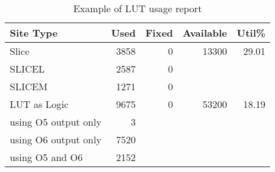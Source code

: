 \begin{table}[tbp]
  \centering
  \caption{Example of LUT usage report}
  \label{tab:eg_lut}
  \begin{tabular}{|l|r|r|r|r|}
    \hline
                 Site Type                 &  Used & Fixed & Available & Util\% \\
\hline
Slice                                      &  3858 &     0 &     13300 & 29.01  \\
\quad  SLICEL                                   &  2587 &     0 &           &        \\
\quad  SLICEM                                   &  1271 &     0 &           &        \\
LUT as Logic                               &  9675 &     0 &     53200 & 18.19  \\
\quad  using O5 output only                     &     3 &       &           &        \\
\quad  using O6 output only                     &  7520 &       &           &        \\
\quad  using O5 and O6                          &  2152 &       &           &        \\
\hline
  \end{tabular}
\end{table}





